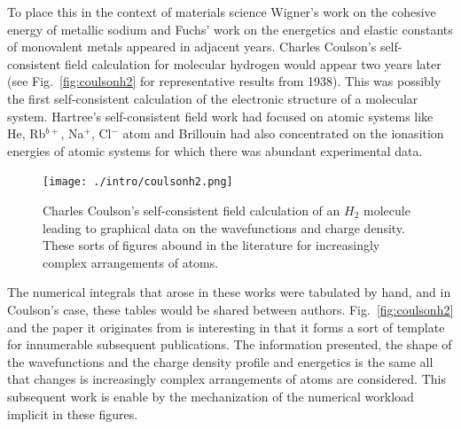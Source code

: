 To place this in the context of materials science Wigner's work on
the cohesive energy of metallic sodium \cite{wigner33,bouckaert36} and Fuchs' work on
the energetics and elastic constants of monovalent metals \cite{fuchs36} appeared in 
adjacent years.
Charles Coulson's self-consistent field calculation for molecular hydrogen would appear 
two years later \cite{coulson38} (see Fig.~\ref{fig:coulsonh2} for representative results 
from 1938). This was possibly the first self-consistent calculation of the electronic structure
of a molecular system. Hartree's self-consistent field work had focused 
on atomic systems like He, Rb$^{b+}$, Na$^{+}$, Cl$^{-}$ atom\cite{hartree28} and
Brillouin had also concentrated on the ionasition energies of atomic systems for
which there was abundant experimental data\cite{brillouin34}.
%
\begin{figure}
\begin{center}
\texttt{[image: ./intro/coulsonh2.png]}
\caption{Charles Coulson's self-consistent field calculation of an $H_2$ 
         molecule leading to graphical data on the wavefunctions and charge density.
         These sorts of figures abound in the literature for increasingly complex arrangements
         of atoms.\label{fig:coulson2}}
\end{center}
\end{figure}
%
The numerical integrals that arose in these 
works were tabulated by hand, and in Coulson's case, these tables 
would be shared between authors. Fig.~\ref{fig:coulsonh2} and the paper it originates
from is interesting in that it forms a sort of template for innumerable subsequent publications.
The information presented, the shape of the wavefunctions and the charge density
profile and energetics is the same all that changes is
increasingly complex arrangements of atoms are considered. This subsequent work is enable
by the mechanization of the numerical workload implicit in these figures. 


